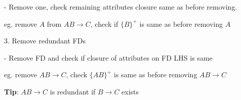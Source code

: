 \documentclass[10pt, a4paper]{article}
\newcommand{\highlight}[1]{{\color{red}\textbf{#1}}}
\newcommand{\tab}[0]{\hspace*{2mm}}
\begin{document}
\begin{multicols*}{3}
		\tab - Remove one, check remaining attributes closure same as before removing.

		\tab eg. remove $A$ from $AB \rightarrow C$, check if $\{B\}^+$ is same as before removing $A$

		3. Remove redundant FDs

		\tab - Remove FD and check if closure of attributes on FD LHS is same

		\tab eg. remove $AB \rightarrow C$, check $\{AB\}^+$ is same as before removing $AB \rightarrow C$

		\highlight{Tip}: $AB \rightarrow C$ is redundant if $B \rightarrow C$ exists











		
	\end{multicols*}
\end{document}
